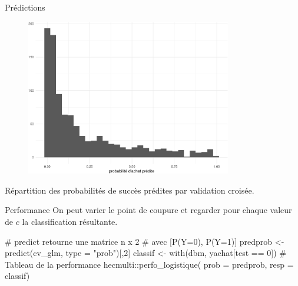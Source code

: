 \documentclass[
  ignorenonframetext,
]{beamer}
\newenvironment{Shaded}{\begin{snugshade}}{\end{snugshade}}
\newcommand{\AttributeTok}[1]{\textcolor[rgb]{0.40,0.45,0.13}{#1}}
\newcommand{\CommentTok}[1]{\textcolor[rgb]{0.37,0.37,0.37}{#1}}
\newcommand{\DecValTok}[1]{\textcolor[rgb]{0.68,0.00,0.00}{#1}}
\newcommand{\FunctionTok}[1]{\textcolor[rgb]{0.28,0.35,0.67}{#1}}
\newcommand{\NormalTok}[1]{\textcolor[rgb]{0.00,0.23,0.31}{#1}}
\newcommand{\OtherTok}[1]{\textcolor[rgb]{0.00,0.23,0.31}{#1}}
\newcommand{\SpecialCharTok}[1]{\textcolor[rgb]{0.37,0.37,0.37}{#1}}
\newcommand{\StringTok}[1]{\textcolor[rgb]{0.13,0.47,0.30}{#1}}
\begin{document}
\begin{frame}{Prédictions}
\protect\hypertarget{pruxe9dictions}{}
\begin{figure}

{\centering \includegraphics[width=0.8\textwidth,height=\textheight]{MATH60602-diapos7_files/figure-beamer/figclassification0-1.pdf}

}

\end{figure}

\footnotesize

Répartition des probabilités de succès prédites par validation croisée.

\normalsize
\end{frame}

\begin{frame}[fragile]{Performance}
\protect\hypertarget{performance}{}
On peut varier le point de coupure et regarder pour chaque valeur de
\(c\) la classification résultante.

\begin{Shaded}
\begin{Highlighting}[numbers=left,,]
\CommentTok{\# predict retourne une matrice n x 2 }
\CommentTok{\# avec [P(Y=0), P(Y=1)]}
\NormalTok{predprob }\OtherTok{\textless{}{-}} \FunctionTok{predict}\NormalTok{(cv\_glm, }\AttributeTok{type =} \StringTok{"prob"}\NormalTok{)[,}\DecValTok{2}\NormalTok{]}
\NormalTok{classif }\OtherTok{\textless{}{-}} \FunctionTok{with}\NormalTok{(dbm, yachat[test }\SpecialCharTok{==} \DecValTok{0}\NormalTok{])}
\CommentTok{\# Tableau de la performance}
\NormalTok{hecmulti}\SpecialCharTok{::}\FunctionTok{perfo\_logistique}\NormalTok{(}
  \AttributeTok{prob =}\NormalTok{ predprob,}
  \AttributeTok{resp =}\NormalTok{ classif)}
\end{Highlighting}
\end{Shaded}
\end{frame}
\end{document}
